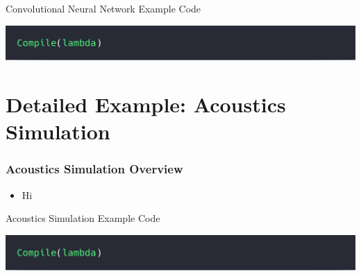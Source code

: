 \documentclass[10pt]{beamer}
\begin{document}
\begin{frame}{Convolutional Neural Network Example Code}
        \begin{block}{}
        \begin{center}
            \includegraphics[width=.5\textwidth]{../images/simpleCompile.png}
        \end{center}
        \end{block}
\end{frame}


\section{Detailed Example: Acoustics Simulation }

\begin{frame}
\frametitle{Acoustics Simulation Overview}
\vspace{.2cm}
\begin{itemize}
    \item Hi
\end{itemize}
\vspace{-1.2cm}
\end{frame}

\begin{frame}{Acoustics Simulation Example Code}
        \begin{block}{}
        \begin{center}
            \includegraphics[width=.5\textwidth]{../images/simpleCompile.png}
        \end{center}
        \end{block}
\end{frame}


\appendix
\end{document}
